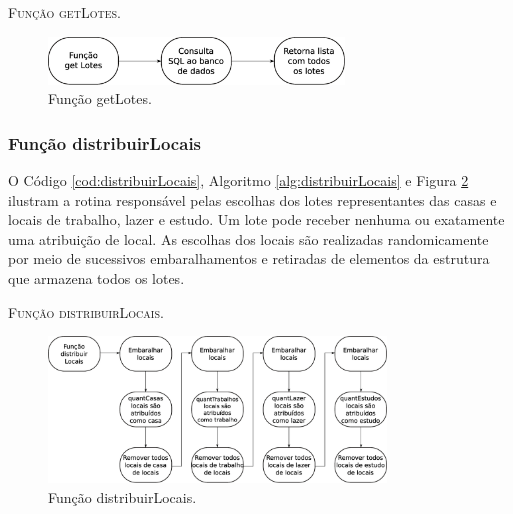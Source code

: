 

\begin{algorithm}[H]
   \SetAlgoLined   
   
   \caption{\textsc{Função getLotes.}}
   \label{alg:getLotes}
\end{algorithm}

\begin{figure}[H]
  \centering
  \includegraphics[width=0.7\textwidth]{Figuras/Simula/Fluxos/getLotes.eps}
  \caption{Função getLotes.}
  \label{fig:getLotes}
\end{figure} 

\newpage

\subsubsection{Função distribuirLocais}

O Código \ref{cod:distribuirLocais}, Algoritmo \ref{alg:distribuirLocais} e Figura \ref{fig:distribuirLocais} ilustram a rotina responsável pelas escolhas dos lotes representantes das casas e locais de trabalho, lazer e estudo. Um lote pode receber nenhuma ou exatamente uma atribuição de local. As escolhas dos locais são realizadas randomicamente por meio de sucessivos embaralhamentos e retiradas de elementos da estrutura que armazena todos os lotes. 



\begin{algorithm}[H]
   \SetAlgoLined   
   
   \caption{\textsc{Função distribuirLocais.}}
   \label{alg:distribuirLocais}
\end{algorithm}

\begin{figure}[H]
  \centering
  \includegraphics[width=0.8\textwidth]{Figuras/Simula/Fluxos/distribuirLocais.eps}
  \caption{Função distribuirLocais.}
  \label{fig:distribuirLocais}
\end{figure} 

